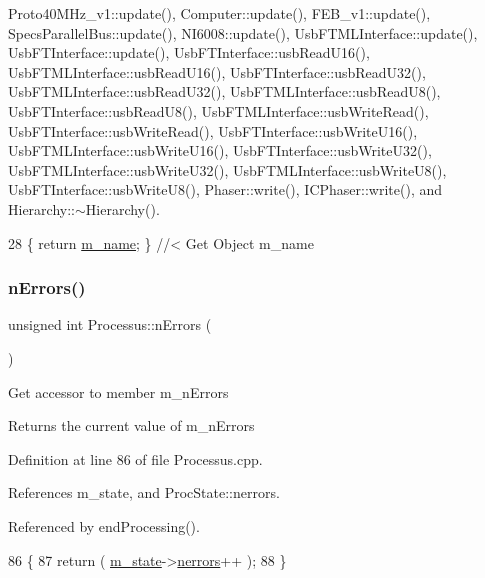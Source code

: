 Proto40\+M\+Hz\+\_\+v1\+::update(), Computer\+::update(), F\+E\+B\+\_\+v1\+::update(), Specs\+Parallel\+Bus\+::update(), N\+I6008\+::update(), Usb\+F\+T\+M\+L\+Interface\+::update(), Usb\+F\+T\+Interface\+::update(), Usb\+F\+T\+Interface\+::usb\+Read\+U16(), Usb\+F\+T\+M\+L\+Interface\+::usb\+Read\+U16(), Usb\+F\+T\+Interface\+::usb\+Read\+U32(), Usb\+F\+T\+M\+L\+Interface\+::usb\+Read\+U32(), Usb\+F\+T\+M\+L\+Interface\+::usb\+Read\+U8(), Usb\+F\+T\+Interface\+::usb\+Read\+U8(), Usb\+F\+T\+M\+L\+Interface\+::usb\+Write\+Read(), Usb\+F\+T\+Interface\+::usb\+Write\+Read(), Usb\+F\+T\+Interface\+::usb\+Write\+U16(), Usb\+F\+T\+M\+L\+Interface\+::usb\+Write\+U16(), Usb\+F\+T\+Interface\+::usb\+Write\+U32(), Usb\+F\+T\+M\+L\+Interface\+::usb\+Write\+U32(), Usb\+F\+T\+M\+L\+Interface\+::usb\+Write\+U8(), Usb\+F\+T\+Interface\+::usb\+Write\+U8(), Phaser\+::write(), I\+C\+Phaser\+::write(), and Hierarchy\+::$\sim$\+Hierarchy().


\begin{DoxyCode}
28 \{ \textcolor{keywordflow}{return} \hyperlink{classObject_a8b83c95c705d2c3ba0d081fe1710f48d}{m\_name}; \} \textcolor{comment}{//< Get Object m\_name}
\end{DoxyCode}
\mbox{\label{classProcessus_a82a0487f82f07cc2c2dc2731f98149e7}} 
\subsubsection{\texorpdfstring{n\+Errors()}{nErrors()}}
{\footnotesize\ttfamily unsigned int Processus\+::n\+Errors (\begin{DoxyParamCaption}{ }\end{DoxyParamCaption})}

Get accessor to member m\+\_\+n\+Errors \begin{DoxyReturn}{Returns}
the current value of m\+\_\+n\+Errors 
\end{DoxyReturn}


Definition at line 86 of file Processus.\+cpp.



References m\+\_\+state, and Proc\+State\+::nerrors.



Referenced by end\+Processing().


\begin{DoxyCode}
86                                 \{
87   \textcolor{keywordflow}{return} ( \hyperlink{classProcessus_ab3539eee42891ceae0baf4395ae7fb61}{m\_state}->\hyperlink{structProcState_a51a0f54ba62b07e07ac8518c5f32828d}{nerrors}++ );
88 \}
\end{DoxyCode}
\mbox{\label{classProcessus_aacf6812880c1d1a2bf14a4a39458f443}} 
